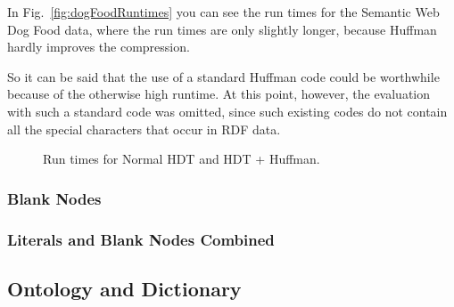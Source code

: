 In Fig.~\ref{fig:dogFoodRuntimes} you can see the run times for the Semantic Web Dog Food data, where the run times are only slightly longer, because Huffman hardly improves the compression.

So it can be said that the use of a standard Huffman code could be worthwhile because of the otherwise high runtime. At this point, however, the evaluation with such a standard code was omitted, since such existing codes do not contain all the special characters that occur in RDF data.


\begin{figure}[h]
	\centering
	\hfill
	\caption{Run times for Normal HDT and HDT + Huffman.}
	\label{fig:huffmanRuntimes}
\end{figure}

\subsubsection{Blank Nodes}

\subsubsection{Literals and Blank Nodes Combined}

\subsection{Ontology and Dictionary}






























